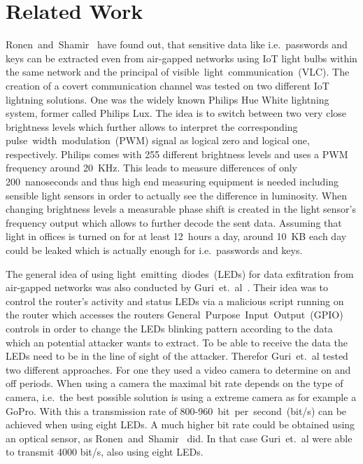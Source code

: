 \section{Related Work} %
\label{sec:related_work}


Ronen~and~Shamir~\cite{Ronen:2016:EFAIDCSL} have found out, that sensitive data like i.e.\ passwords and keys can be extracted even from air-gapped networks using IoT light bulbs within the same network and the principal of visible~light~communication~(VLC). The creation of a covert communication channel was tested on two different IoT lightning solutions. One was the widely known Philips Hue White lightning system, former called Philips Lux. 
The idea is to switch between two very close brightness levels which further allows to interpret the corresponding pulse~width~modulation~(PWM) signal as logical zero and logical one, respectively. Philips comes with 255 different brightness levels and uses a PWM frequency around 20~KHz. 
This leads to measure differences of only 200~nanoseconds and thus high end measuring equipment is needed including sensible light sensors in order to actually see the difference in luminosity.
When changing brightness levels a measurable phase shift is created in the light sensor's frequency output which allows to further decode the sent data.
Assuming that light in offices is turned on for at least 12~hours a day, around 10~KB each day could be leaked which is actually enough for i.e.\ passwords and keys.

The general idea of using light~emitting~diodes~(LEDs) for data exfitration from air-gapped networks was also conducted by Guri~et.~al~\cite{Guri:2017:xCDEANvRL}. Their idea was to control the router's activity and status LEDs via a malicious script running on the router which accesses the routers General~Purpose~Input~Output~(GPIO) controls in order to change the LEDs blinking pattern according to the data which an potential attacker wants to extract.
To be able to receive the data the LEDs need to be in the line of sight of the attacker. Therefor Guri~et.~al tested two different approaches. For one they used a video camera to determine on and off periods. When using a camera the maximal bit rate depends on the type of camera, i.e.\ the best possible solution is using a extreme camera as for example a GoPro. With this a transmission rate of 800-960~bit~per~second~(bit/s) can be achieved when using eight LEDs. A much higher bit rate could be obtained using an optical sensor, as Ronen~and~Shamir~\cite{Ronen:2016:EFAIDCSL} did. In that case Guri~et.~al were able to transmit 4000 bit/s, also using eight LEDs.

